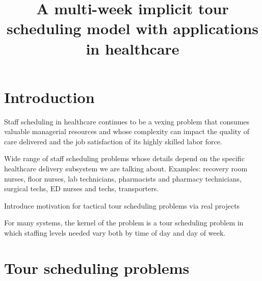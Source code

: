 \documentclass{article}
\begin{document}
\title{A multi-week implicit tour scheduling model with applications in healthcare
}


\author{
}









\section{Introduction}
\label{sec-intro}
Staff scheduling in healthcare continues to be a vexing problem that consumes valuable managerial resources and whose complexity can impact the quality of care delivered and the job satisfaction of its highly skilled labor force. \cite{}

Wide range of staff scheduling problems whose details depend on the specific healthcare delivery subsystem we are talking about. Examples: recovery room nurses, floor nurses, lab technicians, pharmacists and pharmacy technicians, surgical techs, ED nurses and techs, transporters.

Introduce motivation for tactical tour scheduling problems via real projects

For many systems, the kernel of the problem is a tour scheduling problem in which staffing levels needed vary both by time of day and day of week. 

\section{Tour scheduling problems}
\end{document}
